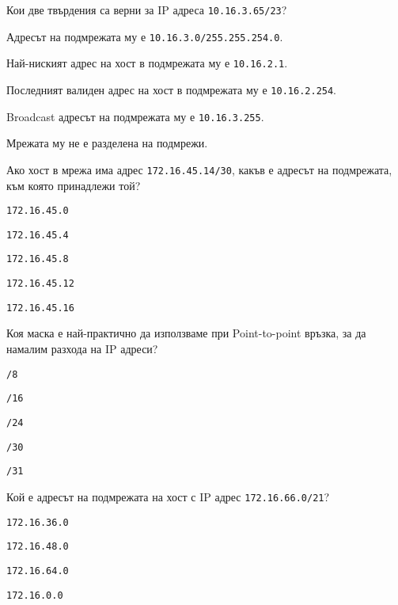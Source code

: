 \begin{q}
  Кои две твърдения са верни за IP адреса \texttt{10.16.3.65/23}?
  \begin{defractors}
  \item Адресът на подмрежата му е \texttt{10.16.3.0/255.255.254.0}.
  \item Най-ниският адрес на хост в подмрежата му е \texttt{10.16.2.1}.
  \item Последният валиден адрес на хост в подмрежата му е \texttt{10.16.2.254}.
  \item Broadcast адресът на подмрежата му е \texttt{10.16.3.255}.
  \item Мрежата му не е разделена на подмрежи.
  \end{defractors}
\end{q}

\begin{q}
  Ако хост в мрежа има адрес \texttt{172.16.45.14/30}, какъв е адресът на
  подмрежата, към която принадлежи той?
  \begin{defractors}
  \item \texttt{172.16.45.0}
  \item \texttt{172.16.45.4}
  \item \texttt{172.16.45.8}
  \item \texttt{172.16.45.12}
  \item \texttt{172.16.45.16}
  \end{defractors}
\end{q}

\begin{q}
  Коя маска е най-практично да използваме при Point-to-point връзка, за да
  намалим разхода на IP адреси?
  \begin{defractors}
  \item \texttt{/8}
  \item \texttt{/16}
  \item \texttt{/24}
  \item \texttt{/30}
  \item \texttt{/31}
  \end{defractors}
\end{q}

\begin{q}
  Кой е адресът на подмрежата на хост с IP адрес \texttt{172.16.66.0/21}?
  \begin{defractors}
  \item \texttt{172.16.36.0}
  \item \texttt{172.16.48.0}
  \item \texttt{172.16.64.0}
  \item \texttt{172.16.0.0}
  \end{defractors}
\end{q}


